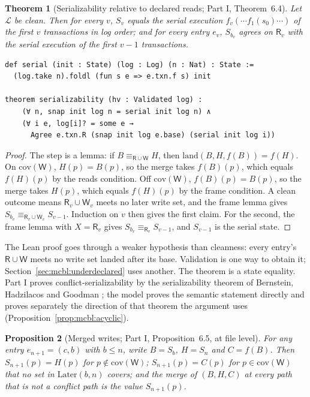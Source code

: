 \documentclass[11pt,letterpaper]{article}
\newtheorem{theorem}{Theorem}[section]
\newtheorem{proposition}[theorem]{Proposition}
\theoremstyle{definition}
\theoremstyle{remark}
\newcommand{\R}{\mathsf{R}}
\newcommand{\W}{\mathsf{W}}
\newcommand{\Snap}[1]{S_{#1}}
\newcommand{\Log}{\mathcal{L}}
\newcommand{\Later}{\mathrm{Later}}
\newcommand{\op}[1]{\mathrm{#1}}
\newcommand{\covd}{\op{cov}}
\newcommand{\lnd}{\op{land}}
\begin{document}
\begin{theorem}[Serializability relative to declared reads; Part I, Theorem~6.4]
\label{thm:mcbl:serial}
Let $\Log$ be clean. Then for every $v$, $\Snap{v}$ equals the serial execution $f_v(\cdots f_1(s_0)\cdots)$ of the first $v$ transactions in log order; and for every entry $e_v$, $\Snap{b_v}$ agrees on $\R_v$ with the serial execution of the first $v-1$ transactions.
\end{theorem}

\begin{lstlisting}[language=Lean,caption={Serializability of clean logs (\texttt{YonedaTx/Serializability.lean})},label={lst:mcbl:serial}]
def serial (init : State) (log : Log) (n : Nat) : State :=
  (log.take n).foldl (fun s e => e.txn.f s) init

theorem serializability (hv : Validated log) :
    (∀ n, snap init log n = serial init log n) ∧
    (∀ i e, log[i]? = some e →
      Agree e.txn.R (snap init log e.base) (serial init log i))
\end{lstlisting}

\begin{proof}
The step is a lemma: if $B\equiv_{\R\cup\W}H$, then $\lnd(B,H,f(B))=f(H)$. On $\covd(\W)$, $H(p)=B(p)$, so the merge takes $f(B)(p)$, which equals $f(H)(p)$ by the reads condition. Off $\covd(\W)$, $f(B)(p)=B(p)$, so the merge takes $H(p)$, which equals $f(H)(p)$ by the frame condition. A clean outcome means $\R_v\cup\W_v$ meets no later write set, and the frame lemma gives $\Snap{b_v}\equiv_{\R_v\cup\W_v}\Snap{v-1}$. Induction on $v$ then gives the first claim. For the second, the frame lemma with $X=\R_v$ gives $\Snap{b_v}\equiv_{\R_v}\Snap{v-1}$, and $\Snap{v-1}$ is the serial state.
\end{proof}

The Lean proof goes through a weaker hypothesis than cleanness: every entry's $\R\cup\W$ meets no write set landed after its base. Validation is one way to obtain it; Section~\ref{sec:mcbl:underdeclared} uses another. The theorem is a state equality. Part I proves conflict-serializability by the serializability theorem of Bernstein, Hadzilacos and Goodman \cite[Theorem 2.1]{bhg1987}; the model proves the semantic statement directly and proves separately the direction of that theorem the argument uses (Proposition~\ref{prop:mcbl:acyclic}).

\begin{proposition}[Merged writes; Part I, Proposition~6.5, at file level]
\label{prop:mcbl:merged}
For any entry $e_{n+1}=(c,b)$ with $b\leq n$, write $B=\Snap{b}$, $H=\Snap{n}$ and $C=f(B)$. Then $\Snap{n+1}(p)=H(p)$ for $p\notin\covd(\W)$; $\Snap{n+1}(p)=C(p)$ for $p\in\covd(\W)$ that no set in $\Later(b,n)$ covers; and the merge of $(B,H,C)$ at every path that is not a conflict path is the value $\Snap{n+1}(p)$.
\end{proposition}
\end{document}
